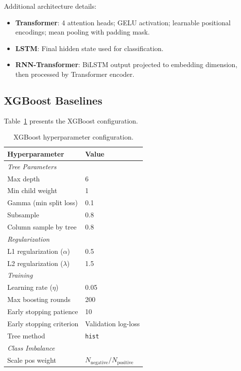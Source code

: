 \documentclass{article}
\theoremstyle{plain}
\theoremstyle{definition}
\theoremstyle{remark}
\begin{document}
Additional architecture details:
\begin{itemize}
    \item \textbf{Transformer}: 4 attention heads; GELU activation; learnable positional encodings; mean pooling with padding mask.
    \item \textbf{LSTM}: Final hidden state used for classification.
    \item \textbf{RNN-Transformer}: BiLSTM output projected to embedding dimension, then processed by Transformer encoder.
\end{itemize}

\subsection{XGBoost Baselines}
\label{appendix:xgboost}

Table~\ref{tab:xgboost_config} presents the XGBoost configuration.

\begin{table}[h]
\centering
\caption{XGBoost hyperparameter configuration.}
\label{tab:xgboost_config}
\begin{tabular}{ll}
\toprule
Hyperparameter & Value \\
\midrule
\multicolumn{2}{l}{\textit{Tree Parameters}} \\
Max depth & 6 \\
Min child weight & 1 \\
Gamma (min split loss) & 0.1 \\
Subsample & 0.8 \\
Column sample by tree & 0.8 \\
\midrule
\multicolumn{2}{l}{\textit{Regularization}} \\
L1 regularization ($\alpha$) & 0.5 \\
L2 regularization ($\lambda$) & 1.5 \\
\midrule
\multicolumn{2}{l}{\textit{Training}} \\
Learning rate ($\eta$) & 0.05 \\
Max boosting rounds & 200 \\
Early stopping patience & 10 \\
Early stopping criterion & Validation log-loss \\
Tree method & \texttt{hist} \\
\midrule
\multicolumn{2}{l}{\textit{Class Imbalance}} \\
Scale pos weight & $N_{\text{negative}} / N_{\text{positive}}$ \\
\bottomrule
\end{tabular}
\end{table}
\end{document}
